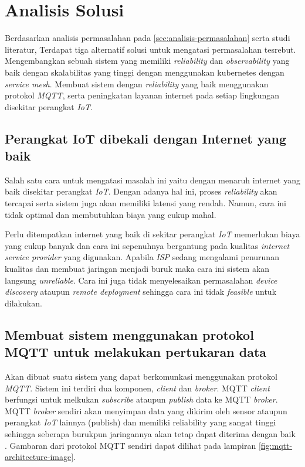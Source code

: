 \section{Analisis Solusi}

Berdasarkan analisis permasalahan pada \ref{sec:analisis-permasalahan} serta studi literatur, Terdapat tiga alternatif solusi untuk mengatasi permasalahan tesrebut.
Mengembangkan sebuah sistem yang memiliki \textit{reliability} dan \textit{observability} yang baik dengan skalabilitas yang tinggi dengan menggunakan kubernetes dengan \textit{service mesh}. Membuat sistem dengan \textit{reliability} yang baik  menggunakan protokol \textit{MQTT}, serta peningkatan layanan internet pada setiap lingkungan disekitar perangkat \textit{IoT}.

\subsection{Perangkat IoT dibekali dengan Internet yang baik}
Salah satu cara untuk mengatasi masalah ini yaitu dengan menaruh internet yang baik disekitar perangkat \textit{IoT}. Dengan adanya hal ini, proses \textit{reliability} akan tercapai serta sistem juga akan memiliki latensi yang rendah. Namun, cara ini tidak optimal dan membutuhkan biaya yang cukup mahal.

Perlu ditempatkan internet yang baik di sekitar perangkat \textit{IoT} memerlukan biaya yang cukup banyak dan cara ini sepenuhnya bergantung pada kualitas \textit{internet service provider} yang digunakan. Apabila \textit{ISP} sedang mengalami penurunan kualitas dan membuat jaringan menjadi buruk maka cara ini sistem akan langsung \textit{unreliable}. Cara ini juga tidak menyelesaikan permasalahan \textit{device discovery} ataupun \textit{remote deployment} sehingga cara ini tidak \textit{feasible} untuk dilakukan.

\subsection{Membuat sistem menggunakan protokol MQTT untuk melakukan pertukaran data}
Akan dibuat suatu sistem yang dapat berkomunkasi menggunakan protokol \textit{MQTT}. Sistem ini terdiri dua komponen, \textit{client} dan \textit{broker}. MQTT \textit{client} berfungsi untuk melkukan \textit{subscribe} ataupun \textit{publish} data ke MQTT \textit{broker}. MQTT \textit{broker} sendiri akan menyimpan data yang dikirim oleh sensor ataupun perangkat \textit{IoT} lainnya (publish) dan memiliki reliability yang sangat tinggi sehingga seberapa burukpun jaringannya akan tetap dapat diterima dengan baik \parencite{mqtt}. Gambaran dari protokol MQTT sendiri dapat dilihat pada lampiran \ref{fig:mqtt-architecture-image}.

